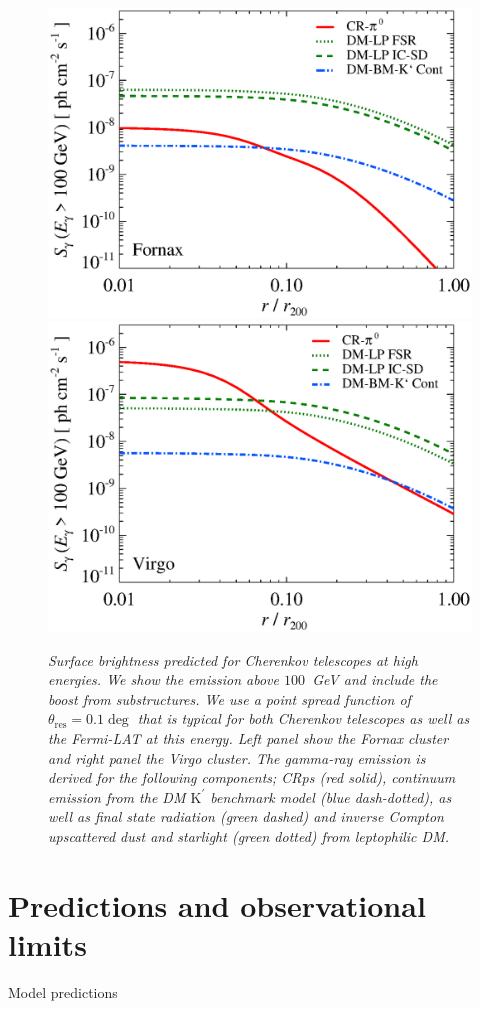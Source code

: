 \documentclass[10pt,aps,pra,reprint,amsmath,amsfonts,amssymb,showpacs]{revtex4-1}
\newcommand{\rmn}{\mathrm}
\newcommand{\psf}{\theta_\rmn{res}}
\newcommand{\Kp}{\rmn{K}^\prime}
\begin{document}
\begin{figure}
\begin{minipage}{2.0\columnwidth}
  \includegraphics[width=0.49\columnwidth]{figures/SB.Fornax.v9.SF300.SubMass.elmu.eps}
  \includegraphics[width=0.49\columnwidth]{figures/SB.Virgo.v9.SF300.SubMass.elmu.eps}
\caption{\it Surface brightness predicted for Cherenkov telescopes at
  high energies. We show the emission above $100$~GeV and include the
  boost from substructures. We use a point spread function of
  $\psf=0.1\deg$ that is typical for both Cherenkov
  telescopes as well as the Fermi-LAT at this energy. Left panel show
  the Fornax cluster and right panel the Virgo cluster. The gamma-ray
  emission is derived for the following components; CRps (red solid),
  continuum emission from the DM $\Kp$ benchmark model (blue
  dash-dotted), as well as final state radiation (green dashed) and
  inverse Compton upscattered dust and starlight (green dotted) from
  leptophilic DM.}
 \label{fig:SB_IACTs}
\end{minipage}
\end{figure}



\section{Predictions and observational limits}
Model predictions
\end{document}
